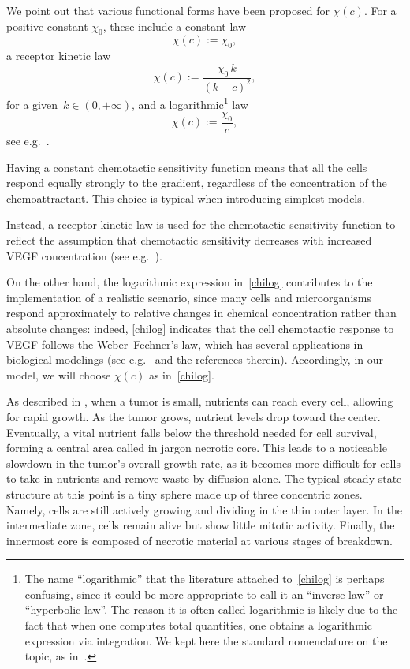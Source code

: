 \documentclass[12pt,a4paper,intlimits,sumlimits]{amsart}
\theoremstyle{definition}
\theoremstyle{plain}
\numberwithin{equation}{section}
\begin{document}
We point out that various functional forms have been proposed for $\chi(c)$. For a positive constant $\chi_0$, these include a constant law
\[
\chi(c):=\chi_0,
\]
a receptor kinetic law
\[
\chi(c):=\frac{\chi_0\, k}{(k+c)^2},
\] for a given~$k\in(0,+\infty)$,
and a logarithmic\footnote{The name ``logarithmic'' that the literature attached to~\eqref{chilog}
is perhaps confusing, since it could be more appropriate to call it
an ``inverse law'' or ``hyperbolic law''. The reason it is often called logarithmic is likely due to the fact that
when one computes total quantities, one obtains a logarithmic expression via integration.
We kept here the standard nomenclature on the topic, as in~\cite[page~155]{ChapSt93}.} law
\begin{equation}\label{chilog}
\chi(c):=\frac{\chi_0}{c},
\end{equation}
see e.g.~\cite{ChapSt93}. 

Having a constant chemotactic sensitivity function means that all the cells respond equally strongly to the gradient, regardless of the concentration of the chemoattractant. This choice is typical when introducing simplest models.

Instead,  a receptor kinetic law is used for the chemotactic sensitivity function to reflect the assumption that chemotactic sensitivity decreases
with increased VEGF concentration (see e.g.~\cite{CHAP98}).

On the other hand, the logarithmic expression in~\eqref{chilog} contributes to the implementation of a realistic scenario,
since many cells and microorganisms respond approximately to relative changes in chemical concentration rather than absolute changes: indeed, \eqref{chilog} indicates that the cell chemotactic response to VEGF follows the Weber--Fechner's law, which has several applications in biological modelings (see e.g.~\cite{KSBACTERIA} and the references therein).
Accordingly,  in our model, we will choose $\chi(c)$ as in~\eqref{chilog}.

As described in \cite{greenspan}, when a tumor is small, nutrients can reach every cell, allowing for rapid growth. As the tumor grows, nutrient levels drop toward the center. Eventually,  a vital nutrient falls below the threshold needed for cell survival, forming a central area called in jargon necrotic core. This leads to a noticeable slowdown in the tumor’s overall growth rate, as it becomes more difficult for cells to take in nutrients and remove waste by diffusion alone.  The typical steady-state structure at this point is a tiny sphere made up of three concentric zones. Namely, cells are still actively growing and dividing in the thin outer layer. In the intermediate zone, cells remain alive but show little mitotic activity.  Finally, the innermost core is composed of necrotic material at various stages of breakdown.
\end{document}
